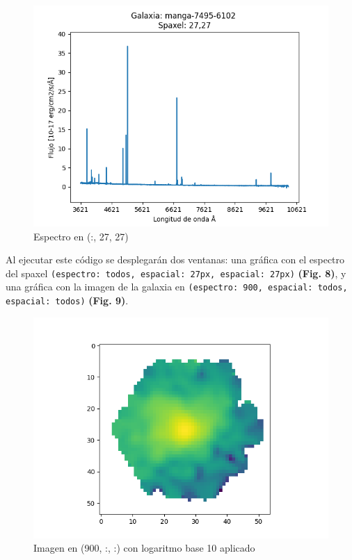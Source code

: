 \documentclass[10pt,twocolumn,a4paper]{opticajnl}
\begin{document}
\begin{figure}
    \centering
    \includegraphics[width=1\linewidth]{espectro1_python.png}
    \caption{Espectro en (:, 27, 27)}
    \label{fig:espectro1_python}
\end{figure}
Al ejecutar este código se desplegarán dos ventanas: una gráfica con el espectro del spaxel \texttt{(espectro: todos, espacial: 27px, espacial: 27px)} \textbf{(Fig. 8)}, y una gráfica con la imagen de la galaxia en \texttt{(espectro: 900, espacial: todos, espacial: todos)} \textbf{(Fig. 9)}.

\begin{figure}
    \centering
    \includegraphics[width=1\linewidth]{imagen1_python.png}
    \caption{Imagen en (900, :, :) con logaritmo base 10 aplicado}
    \label{fig:imagen1_python}
\end{figure}
\end{document}
